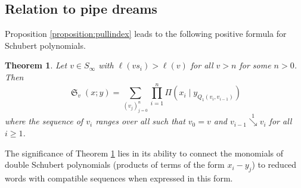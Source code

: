 \documentclass[reqno]{amsart}
\newtheorem{theorem}{Theorem}[section]
\theoremstyle{definition}
\theoremstyle{remark}
\numberwithin{equation}{subsection}
\DeclareMathOperator{\sch}{\mathfrak{S}}
\newcommand{\smpfu}{\mathsf{\Pi}}
\newcommand{\smpre}[2]{\ensuremath{}\smpfu\left( #1 \mid #2\right)}
\newcommand{\downvar}[1]{\stackrel{#1}{\searrow}}
\begin{document}
\subsection{Relation to pipe dreams}

Proposition \ref{proposition:pullindex} leads to the following positive formula for Schubert polynomials.%

\begin{theorem} \label{theorem:schubformula}
	Let $v\in S_\infty$ with $\ell(vs_i)>\ell(v)$ for all $v>n$ for some $n>0$. Then
	$$\sch_v(x;y) = \sum_{(v_j)_{j=0}^n}\prod_{i=1}^n \smpre{x_{i}}{y_{Q_1(v_i,v_{i-1})}}$$
	where the sequence of $v_i$ ranges over all such that $v_0=v$ and $v_{i-1}\downvar{1}v_i$ for all $i\geq 1$.
\end{theorem}


The significance of Theorem \ref{theorem:schubformula} lies in its ability to connect the monomials of double Schubert polynomials (products of terms of the form $x_i-y_j$) to reduced words with compatible sequences when expressed in this form.
\end{document}
